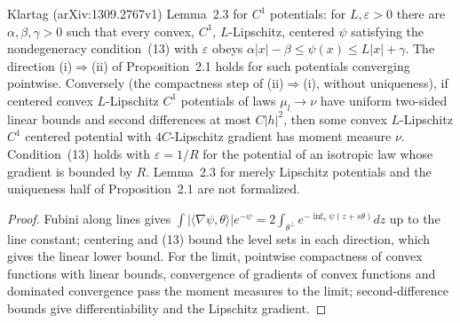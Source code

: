 \begin{lemma}
  \label{lem:klartag-moment-potential-limit}
  \leanok
  Klartag (arXiv:1309.2767v1) Lemma~2.3 for $C^1$ potentials: for $L,\varepsilon>0$ there are
  $\alpha,\beta,\gamma>0$ such that every convex, $C^1$, $L$-Lipschitz, centered $\psi$ satisfying the
  nondegeneracy condition~(13) with $\varepsilon$ obeys $\alpha|x|-\beta\le\psi(x)\le L|x|+\gamma$.
  The direction (i)$\Rightarrow$(ii) of Proposition~2.1 holds for such potentials converging pointwise.
  Conversely (the compactness step of (ii)$\Rightarrow$(i), without uniqueness), if centered convex
  $L$-Lipschitz $C^1$ potentials of laws $\mu_l\to\nu$ have uniform two-sided linear bounds and
  second differences at most $C|h|^2$, then some convex $L$-Lipschitz $C^1$ centered potential with
  $4C$-Lipschitz gradient has moment measure $\nu$. Condition~(13) holds with $\varepsilon=1/R$ for
  the potential of an isotropic law whose gradient is bounded by $R$. Lemma~2.3 for merely Lipschitz
  potentials and the uniqueness half of Proposition~2.1 are not formalized.
\end{lemma}
\begin{proof}
  \leanok
  Fubini along lines gives $\int|\langle\nabla\psi,\theta\rangle|e^{-\psi}=2\int_{\theta^\perp}e^{-\inf_s\psi(z+s\theta)}dz$
  up to the line constant; centering and (13) bound the level sets in each direction, which gives the
  linear lower bound. For the limit, pointwise compactness of convex functions with linear bounds,
  convergence of gradients of convex functions and dominated convergence pass the moment measures
  to the limit; second-difference bounds give differentiability and the Lipschitz gradient.
\end{proof}


